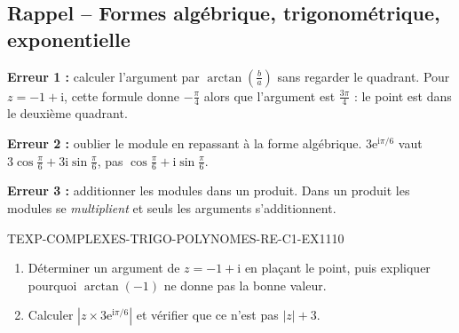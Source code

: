 

\subsection*{Rappel -- Formes algébrique, trigonométrique, exponentielle}

\textbf{Erreur 1 :} calculer l'argument par $\arctan\left(\frac{b}{a}\right)$
sans regarder le quadrant. Pour $z=-1+\mathrm{i}$, cette formule donne
$-\frac{\pi}{4}$ alors que l'argument est $\frac{3\pi}{4}$ : le point est dans
le deuxième quadrant.

\textbf{Erreur 2 :} oublier le module en repassant à la forme algébrique.
$3\mathrm{e}^{\mathrm{i}\pi/6}$ vaut
$3\cos\frac{\pi}{6}+3\mathrm{i}\sin\frac{\pi}{6}$, pas
$\cos\frac{\pi}{6}+\mathrm{i}\sin\frac{\pi}{6}$.

\textbf{Erreur 3 :} additionner les modules dans un produit. Dans un produit
les modules se \emph{multiplient} et seuls les arguments s'additionnent.


\begin{exercice}{TEXP-COMPLEXES-TRIGO-POLYNOMES-RE-C1-EX1}{1}{10}
\begin{enumerate}
  \item Déterminer un argument de $z=-1+\mathrm{i}$ en plaçant le point, puis
        expliquer pourquoi $\arctan(-1)$ ne donne pas la bonne valeur.
  \item Calculer $|z\times 3\mathrm{e}^{\mathrm{i}\pi/6}|$ et vérifier que ce
        n'est pas $|z|+3$.
\end{enumerate}
\end{exercice}
